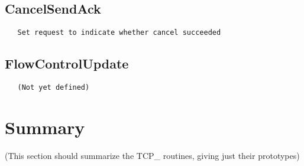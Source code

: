 \documentclass{article}
\begin{document}
\subsection{CancelSendAck}
\begin{verbatim}
   Set request to indicate whether cancel succeeded
\end{verbatim}

\subsection{FlowControlUpdate}
\begin{verbatim}
   (Not yet defined)
\end{verbatim}

\section{Summary}
\label{sec:tcpadi-summary}
(This section should summarize the TCP\_ routines, giving just their prototypes)
\end{document}
